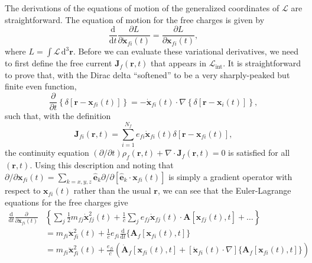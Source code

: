 \documentclass{article}
\begin{document}
The derivations of the equations of motion of the generalized coordinates of $\mathcal{L}$ are straightforward. The equation of motion for the free charges is given by
\begin{equation}
\frac{\mathrm{d}}{\mathrm{d}t}\frac{\partial L}{\partial \dot{\mathbf{x}}_{fi}(t)} = \frac{\partial L}{\partial \mathbf{x}_{fi}(t)},
\end{equation}
where $L = \int\mathcal{L}\,\mathrm{d}^3\mathbf{r}$. Before we can evaluate these variational derivatives, we need to first define the free current $\mathbf{J}_f(\mathbf{r},t)$ that appears in $\mathcal{L}_\mathrm{int}$. It is straightforward to prove that, with the Dirac delta ``softened'' to be a very sharply-peaked but finite even function,
\begin{equation}
\frac{\partial}{\partial t}\left\{\delta[\mathbf{r} - \mathbf{x}_{fi}(t)]\right\} = -\dot{\mathbf{x}}_{fi}(t)\cdot\nabla\left\{\delta[\mathbf{r} - \mathbf{x}_i(t)]\right\},
\end{equation}
such that, with the definition
\begin{equation}
\mathbf{J}_{fi}(\mathbf{r},t) = \sum_{i = 1}^{N_f}e_{fi}\dot{\mathbf{x}}_{fi}(t)\delta[\mathbf{r} - \mathbf{x}_{fi}(t)],
\end{equation}
the continuity equation $(\partial/\partial t)\rho_f(\mathbf{r},t) + \nabla\cdot\mathbf{J}_f(\mathbf{r},t) = 0$ is satisfied for all $(\mathbf{r},t)$. Using this description and noting that $\partial/\partial \mathbf{x}_{fi}(t) = \sum_{k = x,y,z}\hat{\mathbf{e}}_k\partial/\partial [\hat{\mathbf{e}}_k\cdot\mathbf{x}_{fi}(t)]$ is simply a gradient operator with respect to $\mathbf{x}_{fi}(t)$ rather than the usual $\mathbf{r}$, we can see that the Euler-Lagrange equations for the free charges give
\begin{equation}
\begin{split}
\frac{\mathrm{d}}{\mathrm{d}t}\frac{\partial}{\partial \dot{\mathbf{x}}_{fi}(t)}&\left\{\sum_j\frac{1}{2}m_{fj}\dot{\mathbf{x}}_{fj}^2(t) + \frac{1}{c}\sum_je_{fj}\dot{\mathbf{x}}_{fj}(t)\cdot\mathbf{A}[\mathbf{x}_{fj}(t),t] + \ldots\right\}\\
& = m_{fi}\ddot{\mathbf{x}}_{fi}^2(t) + \frac{1}{c}e_{fi}\frac{\mathrm{d}}{\mathrm{d}t}\{\mathbf{A}_f[\mathbf{x}_{fi}(t),t]\}\\
&= m_{fi}\ddot{\mathbf{x}}_{fi}^2(t) + \frac{e_{fi}}{c}\left(\dot{\mathbf{A}}_f[\mathbf{x}_{fi}(t),t] + \left[\dot{\mathbf{x}}_{fi}(t)\cdot\nabla\right]\{\mathbf{A}_f[\mathbf{x}_{fi}(t),t]\}\right)
\end{split}
\end{equation}
\end{document}
